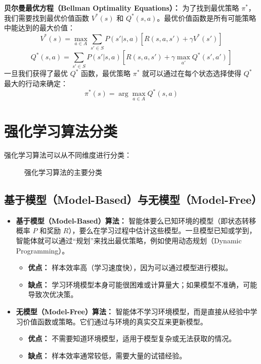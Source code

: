 \textbf{贝尔曼最优方程（Bellman Optimality Equations）：}
为了找到最优策略 $\pi^*$，我们需要找到最优价值函数 $V^*(s)$ 和 $Q^*(s, a)$。最优价值函数是所有可能策略中能达到的最大价值：
$$ V^*(s) = \max_{a \in A} \sum_{s' \in S} P(s'|s, a) [R(s, a, s') + \gamma V^*(s')] $$
$$ Q^*(s, a) = \sum_{s' \in S} P(s'|s, a) [R(s, a, s') + \gamma \max_{a'} Q^*(s', a')] $$
一旦我们获得了最优 $Q^*$ 函数，最优策略 $\pi^*$ 就可以通过在每个状态选择使得 $Q^*$ 最大的行动来确定：
$$ \pi^*(s) = \arg\max_{a \in A} Q^*(s, a) $$

\section{强化学习算法分类}
强化学习算法可以从不同维度进行分类：


\begin{figure}[H]
  \centering
  \resizebox{\textwidth}{!}{}
  \caption{强化学习算法的主要分类}
  \label{fig:ch10_orig5}
\end{figure}

\subsection{基于模型（Model-Based）与无模型（Model-Free）}
\begin{itemize}
    \item \textbf{基于模型（Model-Based）算法：} 智能体要么已知环境的模型（即状态转移概率 $P$ 和奖励 $R$），要么在学习过程中估计这些模型。一旦模型已知或学到，智能体就可以通过“规划”来找出最优策略，例如使用动态规划（Dynamic Programming）。
        \begin{itemize}
            \item \textbf{优点：} 样本效率高（学习速度快），因为可以通过模型进行模拟。
            \item \textbf{缺点：} 学习环境模型本身可能很困难或计算量大；如果模型不准确，可能导致次优决策。
        \end{itemize}
    \item \textbf{无模型（Model-Free）算法：} 智能体不学习环境模型，而是直接从经验中学习价值函数或策略。它们通过与环境的真实交互来更新模型。
        \begin{itemize}
            \item \textbf{优点：} 不需要知道环境模型，适用于模型复杂或无法获取的情况。
            \item \textbf{缺点：} 样本效率通常较低，需要大量的试错经验。
        \end{itemize}
\end{itemize}

